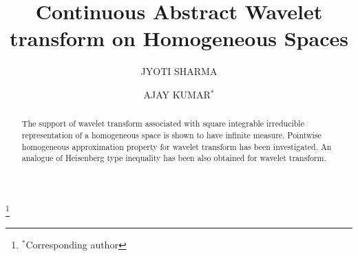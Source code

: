 \documentclass[11pt,reqno]{amsart}
\title[Wavelet transform]{Continuous Abstract Wavelet transform on Homogeneous Spaces}
\numberwithin{equation}{section}
\theoremstyle{definition}
\begin{document}
\begin{abstract}
The support of  wavelet transform associated with square integrable irreducible representation of a homogeneous space is shown to have infinite measure.  Pointwise homogeneous approximation property for wavelet transform has been investigated. An analogue of  Heisenberg type inequality has been also obtained for wavelet transform. 
\end{abstract}
\author[J. Sharma]{JYOTI SHARMA}
\address{Department of Mathematics, University of Delhi, Delhi, 110007, India.}

\author[A. Kumar]{AJAY KUMAR$^\ast$}
\address{Department of Mathematics, University of Delhi, Delhi, 110007, India.}

\thanks{$^\ast$Corresponding author}

\maketitle
\end{document}
